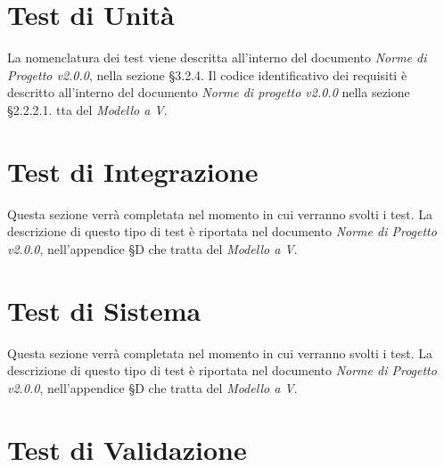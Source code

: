 \section{Test di Unità}
\label{test_u}

La nomenclatura dei test viene descritta all'interno del documento \textit{Norme di Progetto v2.0.0}, nella sezione §3.2.4. Il codice identificativo dei requisiti è descritto all'interno del documento \textit{Norme di progetto v2.0.0} nella sezione §2.2.2.1.
tta del \textit{Modello a V}.

\newpage
\section{Test di Integrazione}
\label{test_i}
Questa sezione verrà completata nel momento in cui verranno svolti i test. La descrizione di questo tipo di test è riportata nel documento \textit{Norme di Progetto v2.0.0}, nell'appendice §D che tratta del \textit{Modello a V}.

\newpage
\section{Test di Sistema}
\label{test_s}
Questa sezione verrà completata nel momento in cui verranno svolti i test. La descrizione di questo tipo di test è riportata nel documento \textit{Norme di Progetto v2.0.0}, nell'appendice §D che tratta del \textit{Modello a V}.
\newpage





\section{Test di Validazione}

